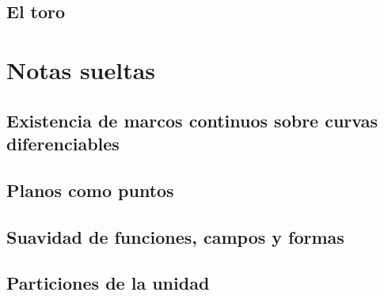 \documentclass[11pt]{report}
\begin{document}
\section{El toro}
%
%


\chapter{Notas sueltas}

\section{Existencia de marcos continuos sobre curvas diferenciables}
%
%
\section{Planos como puntos}
%
\section{Suavidad de funciones, campos y formas}

\section{Particiones de la unidad}


\begin{thebibliography}{9}
%
\end{thebibliography}
\end{document}
